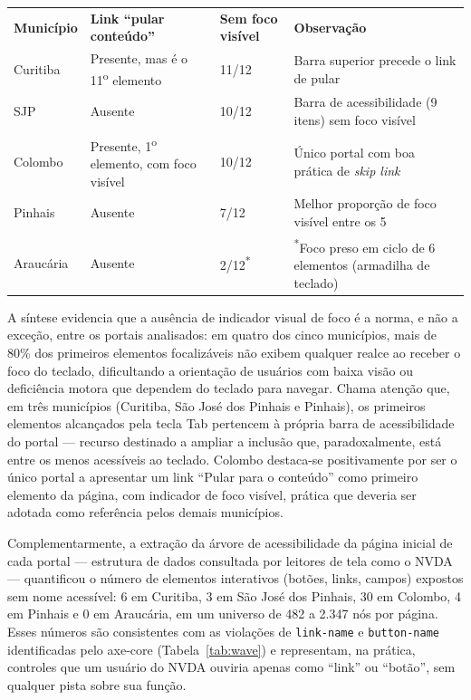 \documentclass[brazil]{ifpr-pinhais}
\begin{document}
\begin{quadro}[htb]
\caption{Síntese da auditoria de navegação por teclado (12 primeiros elementos focalizáveis, página inicial)}
\label{qua:teclado}
\begin{tabular}{p{2.6cm} p{3.4cm} p{2.2cm} p{4.6cm}}
\rowcolor{headerblue}
\color{white}\textbf{Município} & \color{white}\textbf{Link ``pular conteúdo''} & \color{white}\textbf{Sem foco visível} & \color{white}\textbf{Observação} \\
Curitiba    & Presente, mas é o 11\textsuperscript{o} elemento & 11/12 & Barra superior precede o link de pular \\
SJP         & Ausente & 10/12 & Barra de acessibilidade (9 itens) sem foco visível \\
Colombo     & Presente, 1\textsuperscript{o} elemento, com foco visível & 10/12 & Único portal com boa prática de \textit{skip link} \\
Pinhais     & Ausente & 7/12  & Melhor proporção de foco visível entre os 5 \\
Araucária   & Ausente & 2/12\textsuperscript{*}  & \textsuperscript{*}Foco preso em ciclo de 6 elementos (armadilha de teclado) \\
\end{tabular}
\end{quadro}

A síntese evidencia que a ausência de indicador visual de foco é a norma, e não a exceção, entre os portais analisados: em quatro dos cinco municípios, mais de 80\% dos primeiros elementos focalizáveis não exibem qualquer realce ao receber o foco do teclado, dificultando a orientação de usuários com baixa visão ou deficiência motora que dependem do teclado para navegar. Chama atenção que, em três municípios (Curitiba, São José dos Pinhais e Pinhais), os primeiros elementos alcançados pela tecla Tab pertencem à própria barra de acessibilidade do portal --- recurso destinado a ampliar a inclusão que, paradoxalmente, está entre os menos acessíveis ao teclado. Colombo destaca-se positivamente por ser o único portal a apresentar um link ``Pular para o conteúdo'' como primeiro elemento da página, com indicador de foco visível, prática que deveria ser adotada como referência pelos demais municípios.

Complementarmente, a extração da árvore de acessibilidade da página inicial de cada portal --- estrutura de dados consultada por leitores de tela como o NVDA --- quantificou o número de elementos interativos (botões, links, campos) expostos sem nome acessível: 6 em Curitiba, 3 em São José dos Pinhais, 30 em Colombo, 4 em Pinhais e 0 em Araucária, em um universo de 482 a 2.347 nós por página. Esses números são consistentes com as violações de \texttt{link-name} e \texttt{button-name} identificadas pelo axe-core (Tabela~\ref{tab:wave}) e representam, na prática, controles que um usuário do NVDA ouviria apenas como ``link'' ou ``botão'', sem qualquer pista sobre sua função.
\end{document}
